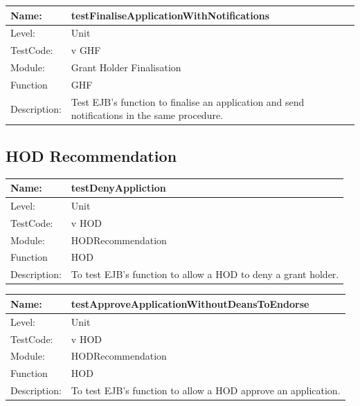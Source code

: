 \documentclass[12pt]{article}
\begin{document}
\begin{flushleft}
\begin{center}
\begin{tabular}{|l|p{12cm}|}
\hline

 Name: & testFinaliseApplicationWithNotifications  \\
\hline
Level: & Unit \\
\hline
TestCode: & v GHF \\
\hline
Module:& Grant Holder Finalisation \\
\hline
Function & GHF \\
\hline
Description: & Test EJB's function to finalise an application and send notifications in the same procedure. \\
\hline
\end{tabular}
\end{center}

\subsection{HOD Recommendation}

\begin{center}
\begin{tabular}{|l|p{12cm}|}
\hline

 Name: & testDenyAppliction  \\
\hline
Level: & Unit \\
\hline
TestCode: & v HOD \\
\hline
Module:& HODRecommendation \\
\hline
Function & HOD \\
\hline
Description: & To test EJB's function to allow a HOD to deny a grant holder. \\
\hline
\end{tabular}
\end{center}


\begin{center}
\begin{tabular}{|l|p{12cm}|}
\hline

 Name: & testApproveApplicationWithoutDeansToEndorse  \\
\hline
Level: & Unit \\
\hline
TestCode: & v HOD \\
\hline
Module:& HODRecommendation \\
\hline
Function & HOD \\
\hline
Description: & To test EJB's function to allow a HOD approve an application. \\
\hline
\end{tabular}
\end{center}



\end{flushleft}
\end{document}
